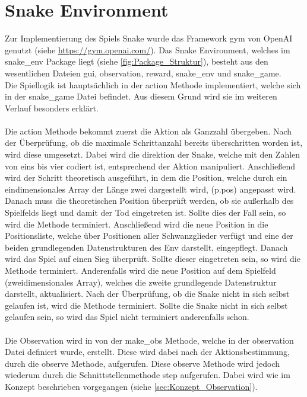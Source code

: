\section{Snake Environment} \label{sec:Implementierung_Environment}
Zur Implementierung des Spiels Snake wurde das Framework gym von OpenAI genutzt (siehe \url{https://gym.openai.com/}). Das Snake Environment, welches im snake\_env Package liegt (siehe \ref{fig:Package_Struktur}), besteht aus den wesentlichen Dateien gui, observation, reward, snake\_env und snake\_game.
\\Die Spiellogik ist hauptsächlich in der action Methode implementiert, welche sich in der snake\_game Datei befindet. Aus diesem Grund wird sie im weiteren Verlauf besonders erklärt.\\
\\Die action Methode bekommt zuerst die Aktion als Ganzzahl übergeben. Nach der Überprüfung, ob die maximale Schrittanzahl bereits überschritten worden ist, wird diese umgesetzt. Dabei wird die direktion der Snake, welche mit den Zahlen von eins bis vier codiert ist, entsprechend der Aktion manipuliert. Anschließend wird der Schritt theoretisch ausgeführt, in dem die Position, welche durch ein eindimensionales Array der Länge zwei dargestellt wird, (p.pos) angepasst wird.\\
Danach muss die theoretischen Position überprüft werden, ob sie außerhalb des Spielfelds liegt und damit der Tod eingetreten ist. Sollte dies der Fall sein, so wird die Methode terminiert.
Anschließend wird die neue Position in die Positionsliste, welche über Positionen aller Schwanzglieder verfügt und eine der beiden grundlegenden Datenstrukturen des Env darstellt, eingepflegt. 
Danach wird das Spiel auf einen Sieg überprüft. Sollte dieser eingetreten sein, so wird die Methode terminiert. Anderenfalls wird die neue Position auf dem Spielfeld (zweidimensionales Array), welches die zweite grundlegende Datenstruktur darstellt, aktualisiert. Nach der Überprüfung, ob die Snake nicht in sich selbst gelaufen ist, wird die Methode terminiert. Sollte die Snake nicht in sich selbst gelaufen sein, so wird das Spiel nicht terminiert anderenfalls schon.\\
\\Die Observation wird in von der make\_obs Methode, welche in der observation Datei definiert wurde, erstellt. 
Diese wird dabei nach der Aktionsbestimmung, durch die observe Methode, aufgerufen. Diese observe Methode wird jedoch wiederum durch die Schnittstellenmethode step aufgerufen. Dabei wird wie im Konzept beschrieben vorgegangen (siehe \ref{sec:Konzept_Observation}).\\
